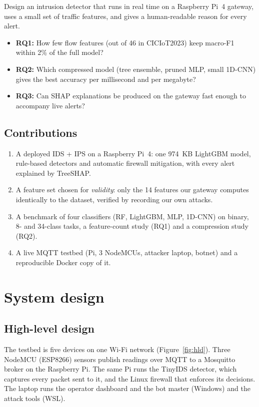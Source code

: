 \documentclass[11pt,a4paper]{article}
\begin{document}
Design an intrusion detector that runs in real time on a Raspberry Pi~4 gateway, uses a small set of traffic
features, and gives a human-readable reason for every alert.

\begin{itemize}
  \item \textbf{RQ1:} How few flow features (out of 46 in CICIoT2023) keep macro-F1 within 2\% of the full model?
  \item \textbf{RQ2:} Which compressed model (tree ensemble, pruned MLP, small 1D-CNN) gives the best accuracy per
        millisecond and per megabyte?
  \item \textbf{RQ3:} Can SHAP explanations be produced on the gateway fast enough to accompany live alerts?
\end{itemize}

\subsection{Contributions}

\begin{enumerate}
  \item A deployed IDS + IPS on a Raspberry Pi~4: one 974~KB LightGBM model, rule-based detectors and automatic
        firewall mitigation, with every alert explained by TreeSHAP.
  \item A feature set chosen for \emph{validity}: only the 14 features our gateway computes identically to the
        dataset, verified by recording our own attacks.
  \item A benchmark of four classifiers (RF, LightGBM, MLP, 1D-CNN) on binary, 8- and 34-class tasks, a feature-count
        study (RQ1) and a compression study (RQ2).
  \item A live MQTT testbed (Pi, 3 NodeMCUs, attacker laptop, botnet) and a reproducible Docker copy of it.
\end{enumerate}

\section{System design}

\subsection{High-level design}

The testbed is five devices on one Wi-Fi network (Figure~\ref{fig:hld}). Three NodeMCU (ESP8266) sensors publish
readings over MQTT to a Mosquitto broker on the Raspberry Pi. The same Pi runs the TinyIDS detector, which captures
every packet sent to it, and the Linux firewall that enforces its decisions. The laptop runs the operator dashboard
and the bot master (Windows) and the attack tools (WSL).
\end{document}
